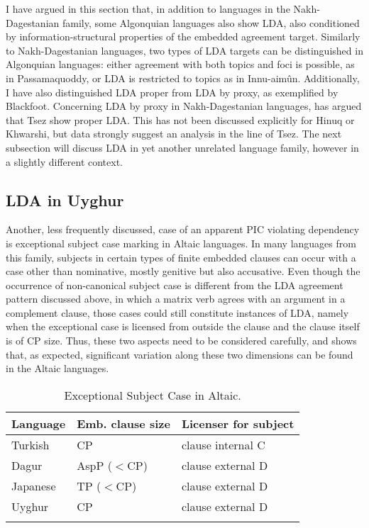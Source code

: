\documentclass[output=paper
,modfonts
,nonflat]{langsci/langscibook}
\begin{document}
I have argued in this section that, in addition to languages in the Nakh-Da\-ges\-ta\-nian family, some Algonquian languages also show LDA, also conditioned by information-structural properties of the embedded agreement target. Similarly to Nakh-Dagestanian languages, two types of LDA targets can be distinguished in Algonquian languages: either agreement with both topics and foci is possible, as in Passamaquoddy, or LDA is restricted to topics as in Innu-aim\^{u}n. Additionally, I have also distinguished LDA proper from LDA by proxy, as exemplified by Blackfoot. Concerning LDA by proxy in Nakh-Dagestanian languages, \citet{Polinsky2003} has argued that Tsez show proper LDA. This has not been discussed explicitly for Hinuq or Khwarshi, but data strongly suggest an analysis in the line of Tsez. The next subsection will discuss LDA in yet another unrelated language family, however in a slightly different context.

\subsection{LDA in Uyghur}

Another, less frequently discussed, case of an apparent PIC violating dependency is exceptional subject case marking in Altaic languages. In many languages from this family, subjects in certain types of finite embedded clauses can occur with a case other than nominative, mostly genitive but also accusative. Even though the occurrence of non-canonical subject case is different from the LDA agreement pattern discussed above, in which a matrix verb agrees with an argument in a complement clause, those cases could still constitute instances of LDA, namely when the exceptional case is licensed from outside the clause and the clause itself is of CP size. Thus, these two aspects need to be considered carefully, and  shows that, as expected, significant variation along these two dimensions can be found in the Altaic languages.
\begin{table}
\caption{Exceptional Subject Case in Altaic.\label{tab:exc_s_c}}
 \begin{tabular}{lll} 
  \lsptoprule
  Language  & Emb. clause size & Licenser for subject\\
  \midrule
  Turkish \citep{Kornfilt2008} & CP & clause internal C\\
  Dagur \citep{Hale2002} & AspP ($ < $CP) & clause external D\\
  Japanese \citep{Miyagawa2011} & TP ($ < $CP) & clause external D\\
  Uyghur \citep{Asarina_Hartman2011a} & CP & clause external D\\
  \lspbottomrule
 \end{tabular}
\end{table}
\end{document}

